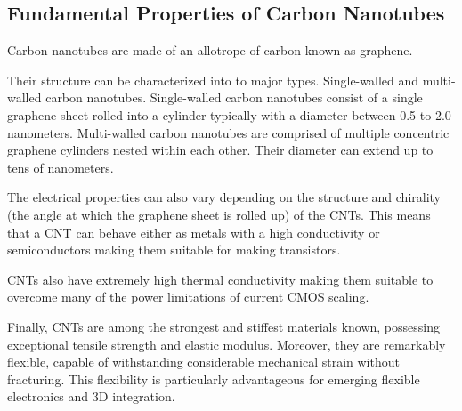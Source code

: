 \documentclass[sigconf,authordraft]{acmart}
\begin{document}
\subsection{Fundamental Properties of Carbon Nanotubes}
Carbon nanotubes are made of an allotrope of carbon known as 
graphene.

Their structure can be characterized into to major types.
Single-walled and multi-walled carbon nanotubes. Single-walled 
carbon nanotubes consist of a single graphene sheet rolled into 
a cylinder typically with a diameter between 0.5 to 2.0 
nanometers. Multi-walled carbon nanotubes are comprised of 
multiple concentric graphene cylinders nested within each other. 
Their diameter can extend up to tens of nanometers. 

The electrical properties can also vary depending on the structure 
and chirality (the angle at which the graphene sheet
is rolled up) of the CNTs. This means that a CNT can behave either 
as metals with a high conductivity or semiconductors making them 
suitable for making transistors. 

CNTs also have extremely high thermal conductivity making them
suitable to overcome many of the power limitations of current 
CMOS scaling.

Finally, CNTs are among the strongest and stiffest materials 
known, possessing exceptional tensile strength and elastic 
modulus. Moreover, they are remarkably flexible, capable of 
withstanding considerable mechanical strain without fracturing. 
This flexibility is particularly advantageous for emerging 
flexible electronics and 3D integration. 
\end{document}
